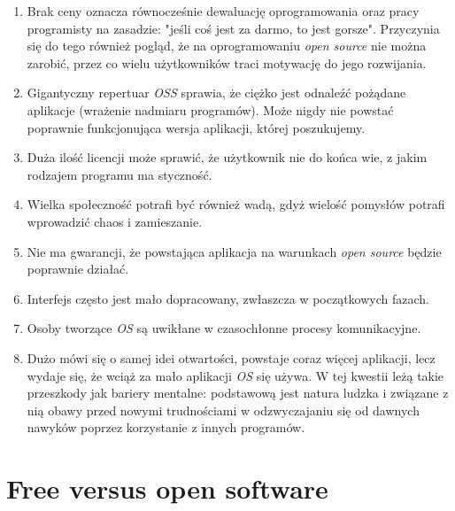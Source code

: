 \documentclass{article}
\begin{document}
\begin{enumerate}
    \item Brak ceny oznacza równocześnie dewaluację oprogramowania oraz pracy programisty na zasadzie: "jeśli coś jest za darmo, to jest gorsze". Przyczynia się do tego również pogląd, że na oprogramowaniu \emph{open source} nie można zarobić, przez co wielu użytkowników traci motywację do jego rozwijania\cite{Kotula}.
    
    \item Gigantyczny repertuar \emph{OSS} sprawia, że ciężko jest odnaleźć pożądane aplikacje (wrażenie nadmiaru programów). Może nigdy nie powstać poprawnie funkcjonująca wersja aplikacji, której poszukujemy\cite{Kotula}.
    
    \item Duża ilość licencji może sprawić, że użytkownik nie do końca wie, z jakim rodzajem programu ma styczność\cite{Kotula}.
    
    \item Wielka społeczność potrafi być również wadą, gdyż wielość pomysłów potrafi wprowadzić chaos i zamieszanie\cite{Kotula}.
    
    \item Nie ma gwarancji, że powstająca aplikacja na warunkach \emph{open source} będzie poprawnie działać\cite{Kotula}.
    
    \item Interfejs często jest mało dopracowany, zwłaszcza w początkowych fazach\cite{Kotula}.
    
    \item Osoby tworzące \emph{OS} są uwikłane w czasochłonne procesy komunikacyjne\cite{Kotula}.
    
    \item Dużo mówi się o samej idei otwartości, powstaje coraz więcej aplikacji, lecz wydaje się, że wciąż za mało aplikacji \emph{OS} się używa. W tej kwestii leżą takie przeszkody jak bariery mentalne: podstawową jest natura ludzka i związane z nią obawy przed nowymi trudnościami w odzwyczajaniu się od dawnych nawyków poprzez korzystanie z innych programów\cite{Kotula}.
\end{enumerate}

\section{Free versus open software}
\end{document}

